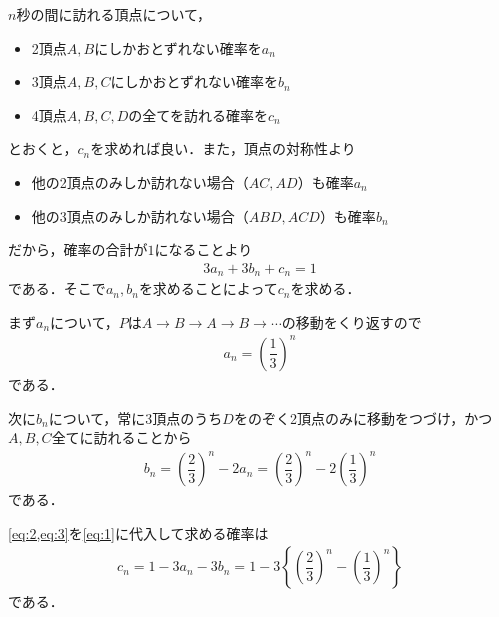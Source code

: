 \documentclass[../../main.tex]{subfiles}
\begin{document}
$n$秒の間に訪れる頂点について，
\begin{itemize}
  \item 2頂点$A,B$にしかおとずれない確率を$a_n$ \\
  \item 3頂点$A,B,C$にしかおとずれない確率を$b_n$ \\
  \item 4頂点$A,B,C,D$の全てを訪れる確率を$c_n$
\end{itemize}
とおくと，$c_n$を求めれば良い．また，頂点の対称性より
\begin{itemize}
  \item 他の2頂点のみしか訪れない場合（$AC,AD$）も確率$a_n$ \\
  \item 他の3頂点のみしか訪れない場合（$ABD,ACD$）も確率$b_n$
\end{itemize}
だから，確率の合計が$1$になることより
\begin{align}
  3a_n+3b_n+c_n = 1 \label{eq:1}
\end{align}
である．そこで$a_n,b_n$を求めることによって$c_n$を求める．

まず$a_n$について，$P$は$A\to B\to A\to B\to\cdots$の移動をくり返すので
\begin{align}
  a_n=\left(\dfrac{1}{3}\right)^n \label{eq:2}
\end{align}
である．

次に$b_n$について，常に3頂点のうち$D$をのぞく2頂点のみに移動をつづけ，かつ$A,B,C$全てに訪れることから
\begin{align}
  b_n
  =\left(\dfrac{2}{3}\right)^n-2a_n
  =\left(\dfrac{2}{3}\right)^n-2\left(\dfrac{1}{3}\right)^n \label{eq:3}
\end{align}
である．

\cref{eq:2,eq:3}を\cref{eq:1}に代入して求める確率は
\begin{align}
  c_n=1-3a_n-3b_n
  =1-3\left\{\left(\dfrac{2}{3}\right)^n-\left(\dfrac{1}{3}\right)^n\right\}
\end{align}
である．
\end{document}
